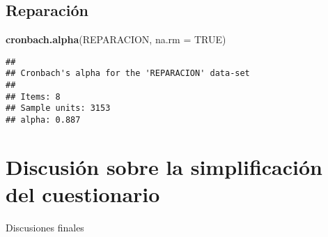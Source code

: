 \documentclass[
  10pt,
  spanish,
]{article}
\newenvironment{Shaded}{\begin{snugshade}}{\end{snugshade}}
\newcommand{\DataTypeTok}[1]{\textcolor[rgb]{0.13,0.29,0.53}{#1}}
\newcommand{\KeywordTok}[1]{\textcolor[rgb]{0.13,0.29,0.53}{\textbf{#1}}}
\newcommand{\NormalTok}[1]{#1}
\newcommand{\OtherTok}[1]{\textcolor[rgb]{0.56,0.35,0.01}{#1}}
\begin{document}
\hypertarget{reparaciuxf3n-3}{%
\subsection{Reparación}\label{reparaciuxf3n-3}}

\begin{Shaded}
\begin{Highlighting}[]
\KeywordTok{cronbach.alpha}\NormalTok{(REPARACION, }\DataTypeTok{na.rm =} \OtherTok{TRUE}\NormalTok{)}
\end{Highlighting}
\end{Shaded}

\begin{verbatim}
## 
## Cronbach's alpha for the 'REPARACION' data-set
## 
## Items: 8
## Sample units: 3153
## alpha: 0.887
\end{verbatim}

\hypertarget{discusiuxf3n-sobre-la-simplificaciuxf3n-del-cuestionario}{%
\section{Discusión sobre la simplificación del
cuestionario}\label{discusiuxf3n-sobre-la-simplificaciuxf3n-del-cuestionario}}

Discusiones finales
\end{document}
